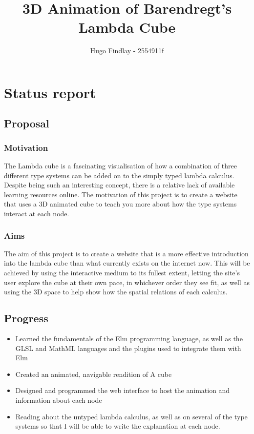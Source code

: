 \documentclass[11pt]{article}
\title{ 3D Animation of Barendregt's Lambda Cube}
\author{ Hugo Findlay - 2554911f }
\begin{document}
    \maketitle
    
    
     

\section{Status report}

\subsection{Proposal}\label{proposal}

\subsubsection{Motivation}\label{motivation}

The Lambda cube is a fascinating visualisation of how a combination of 
three different type systems can be added on to the simply typed lambda calculus.
Despite being such an interesting concept, there is a relative lack of 
available learning resources online.  The motivation of this project is to 
create a website that uses a 3D animated cube to teach you more about how
the type systems interact at each node.

\subsubsection{Aims}\label{aims}

The aim of this project is to create a website that is a more effective 
introduction into the lambda cube than what currently exists on the 
internet now.  This will be achieved by using the interactive medium
to its fullest extent, letting the site's user explore the cube at their
own pace, in whichever order they see fit, as well as using the 3D space to
help show how the spatial relations of each calculus.

\subsection{Progress}\label{progress}

\begin{itemize}
    \tightlist
    \item Learned the fundamentals of the Elm programming language, as well as
    the GLSL and MathML languages and the plugins used to integrate them with Elm
    \item Created an animated, navigable rendition of A cube
    \item Designed and programmed the web interface to host the animation and 
    information about each node
    \item Reading about the untyped lambda calculus, as well as on several of the
    type systems so that I will be able to write the explanation at each node.

\end{itemize}
\end{document}
